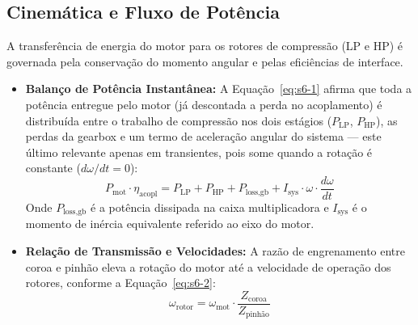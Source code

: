 \documentclass[12pt,a4paper]{article}
\numberwithin{equation}{section}
\numberwithin{table}{section}
\numberwithin{figure}{section}
\begin{document}
{	\subsection{\textbf{Cinemática e Fluxo de Potência}}
	A transferência de energia do motor para os rotores de compressão (LP e HP) é governada pela conservação do momento angular e pelas eficiências de interface.
	\begin{itemize}
		\item \textbf{Balanço de Potência Instantânea:} A Equação~\eqref{eq:s6-1} afirma que toda a potência entregue pelo motor (já descontada a perda no acoplamento) é distribuída entre o trabalho de compressão nos dois estágios ($P_{\text{LP}}$, $P_{\text{HP}}$), as perdas da gearbox e um termo de aceleração angular do sistema — este último relevante apenas em transientes, pois some quando a rotação é constante ($d\omega/dt = 0$):
		\begin{equation}\label{eq:s6-1}
 P_{\text{mot}} \cdot \eta_{\text{acopl}} = P_{\text{LP}} + P_{\text{HP}} + P_{\text{loss,gb}} + I_{\text{sys}} \cdot \omega \cdot \frac{d\omega}{dt}
\end{equation}
		Onde $P_{\text{loss,gb}}$ é a potência dissipada na caixa multiplicadora e $I_{\text{sys}}$ é o momento de inércia equivalente referido ao eixo do motor.
		\item \textbf{Relação de Transmissão e Velocidades:} A razão de engrenamento entre coroa e pinhão eleva a rotação do motor até a velocidade de operação dos rotores, conforme a Equação~\eqref{eq:s6-2}:
		\begin{equation}\label{eq:s6-2}
 \omega_{\text{rotor}} = \omega_{\text{mot}} \cdot \frac{Z_{\text{coroa}}}{Z_{\text{pinhão}}} 
\end{equation}
	\end{itemize}
	
}
\end{document}
